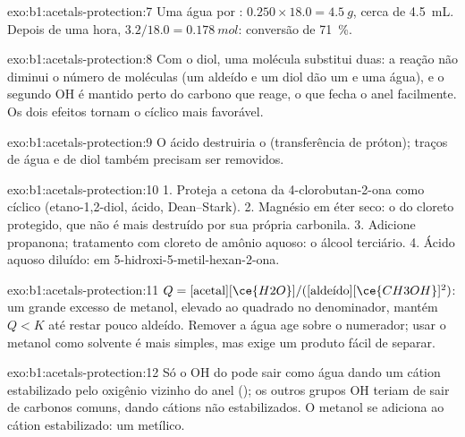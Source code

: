 \begin{solution}{exo:b1:acetals-protection:7}
Uma água por : $0.250 \times 18.0 = \qty{4.5}{g}$, cerca de
\qty{4.5}{mL}. Depois de uma hora, $3.2/18.0 = \qty{0.178}{mol}$: conversão de
\qty{71}{\percent}.
\end{solution}

\begin{solution}{exo:b1:acetals-protection:8}
Com o diol, uma molécula substitui duas: a reação não diminui o número de
moléculas (um aldeído e um diol dão um  e uma água), e o segundo OH
é mantido perto do carbono que reage, o que fecha o anel facilmente. Os
dois efeitos tornam o  cíclico mais favorável.
\end{solution}

\begin{solution}{exo:b1:acetals-protection:9}
O ácido destruiria o  (transferência de próton);
traços de água e de diol também precisam ser removidos.
\end{solution}

\begin{solution}{exo:b1:acetals-protection:10}
1. Proteja a cetona da 4-clorobutan-2-ona como  cíclico
(etano-1,2-diol,  ácido, Dean--Stark). 2. Magnésio em éter seco:
o  do cloreto protegido, que não é mais destruído por
sua própria carbonila. 3. Adicione propanona; tratamento com cloreto de
amônio aquoso: o álcool terciário. 4. Ácido aquoso diluído: 
em 5-hidroxi-5-metil-hexan-2-ona.
\end{solution}

\begin{solution}{exo:b1:acetals-protection:11}
$Q = [\text{acetal}][\ce{H2O}]/([\text{aldeído}][\ce{CH3OH}]^2)$: um grande
excesso de metanol, elevado ao quadrado no denominador, mantém $Q < K$ até
restar pouco aldeído. Remover a água age sobre o numerador; usar o metanol
como solvente é mais simples, mas exige um produto fácil de separar.
\end{solution}

\begin{solution}{exo:b1:acetals-protection:12}
Só o OH do  pode sair como água dando um cátion estabilizado
pelo oxigênio vizinho do anel (); os outros grupos OH teriam de
sair de carbonos comuns, dando cátions não estabilizados. O metanol se
adiciona ao cátion estabilizado: um  metílico.
\end{solution}

